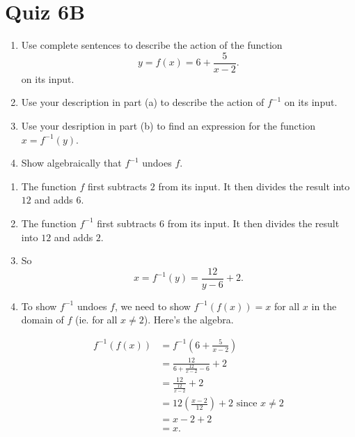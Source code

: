 \documentclass{ximera}
\begin{document}
\section{Quiz 6B}
\begin{question} \label{Q4v22dd3}
\begin{enumerate}

\item[(a)] Use complete sentences to describe the action of the function
\[
    y = f(x) = 6 + \frac{5}{x-2}.
\]
on its input.

\item[(b)] Use your description in part (a) to describe the action of $f^{-1}$ on its input.

\item[(c)] Use your desription in part (b) to find an expression for the function $x = f^{-1}(y)$.

\item[(d)] Show algebraically that $f^{-1}$ undoes $f$. 

\end{enumerate}

\begin{explanation}
\begin{enumerate}
\item The function $f$ first subtracts $2$ from its input. It then divides the result into $12$ and adds $6$.

\item The function $f^{-1}$ first subtracts $6$ from its input. It then divides the result into $12$ and adds $2$.

\item So
\[
   x = f^{-1}(y) = \frac{12}{y-6} + 2.
\]

\item To show $f^{-1}$ undoes $f$, we need to show $f^{-1}(f(x)) = x$ for all $x$ in the domain of $f$ (ie. for all $x\neq 2$). Here's the algebra.

\begin{align*}
  f^{-1}(f(x))  &= f^{-1} \left(  6 + \frac{5}{x-2} \right) \\
                     &= \frac{12}{ 6 + \frac{12}{x-2} - 6} +2 \\
                     &= \frac{12}{\frac{12}{x-2}} + 2 \\
                     &= 12\left( \frac{x-2}{12} \right) +2  \text{ since } x \neq 2\\  
                     &= x-2 + 2 \\
                    &= x.
\end{align*}


\end{enumerate}
\end{explanation}
\end{question}
\end{document}
